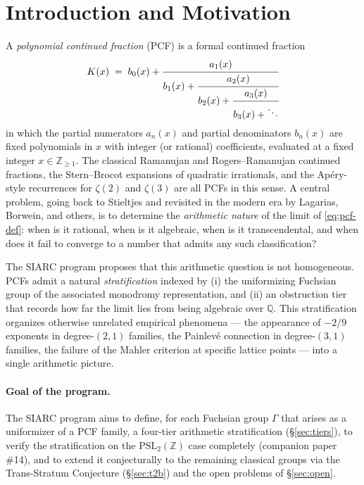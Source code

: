 \documentclass[11pt,a4paper]{article}
\theoremstyle{definition}
\theoremstyle{remark}
\newcommand{\PSLZ}{\mathrm{PSL}_2(\mathbb{Z})}
\newcommand{\Q}{\mathbb{Q}}
\newcommand{\Z}{\mathbb{Z}}
\begin{document}
\tableofcontents

\section{Introduction and Motivation}
\label{sec:intro}

A \emph{polynomial continued fraction} (PCF) is a formal continued fraction
\begin{equation}
  \label{eq:pcf-def}
  K(x) \;=\; b_0(x) + \cfrac{a_1(x)}{b_1(x) + \cfrac{a_2(x)}{b_2(x) + \cfrac{a_3(x)}{b_3(x) + \ddots}}}
\end{equation}
in which the partial numerators $a_n(x)$ and partial denominators $b_n(x)$
are fixed polynomials in $x$ with integer (or rational) coefficients, evaluated
at a fixed integer $x \in \Z_{\geq 1}$. The classical Ramanujan and
Rogers--Ramanujan continued fractions, the Stern--Brocot expansions of
quadratic irrationals, and the Apéry-style recurrences for $\zeta(2)$ and
$\zeta(3)$ are all PCFs in this sense. A central problem, going back to
Stieltjes and revisited in the modern era by Lagarias, Borwein, and others,
is to determine the \emph{arithmetic nature} of the limit of \eqref{eq:pcf-def}:
when is it rational, when is it algebraic, when is it transcendental, and
when does it fail to converge to a number that admits any such classification?

The SIARC program proposes that this arithmetic question is not
homogeneous. PCFs admit a natural \emph{stratification} indexed by
(i) the uniformizing Fuchsian group of the associated monodromy
representation, and (ii) an obstruction tier that records how far the
limit lies from being algebraic over $\Q$. This stratification organizes
otherwise unrelated empirical phenomena --- the appearance of $-2/9$
exponents in degree-$(2,1)$ families, the Painlevé connection in
degree-$(3,1)$ families, the failure of the Mahler criterion at
specific lattice points --- into a single arithmetic picture.

\paragraph{Goal of the program.}
The SIARC program aims to define, for each Fuchsian group $\Gamma$ that
arises as a uniformizer of a PCF family, a four-tier arithmetic
stratification (\S\ref{sec:tiers}), to verify the stratification on the
$\PSLZ$ case completely (companion paper \#14), and to extend it
conjecturally to the remaining classical groups via the Trans-Stratum
Conjecture (\S\ref{sec:t2b}) and the open problems of \S\ref{sec:open}.
\end{document}
